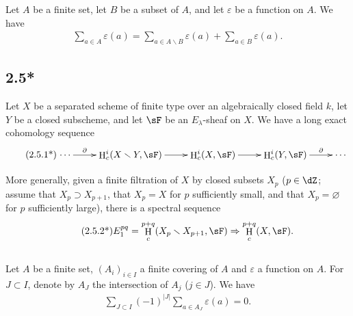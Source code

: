 \documentclass[oneside]{book}
\DeclareMathOperator{\h}{H}
\renewcommand{\setminus}{\smallsetminus}
\theoremstyle{sga-source}
\theoremstyle{sga-source-dash}
\theoremstyle{sga-source-dotdash}
\theoremstyle{sga-source-number-note-dash}
\theoremstyle{sga-source-note-number-dotdash}
\theoremstyle{sga-source-example-dotdash}
\theoremstyle{sga-source-inline-number}
\theoremstyle{sga-source-bare-number}
\theoremstyle{sga-source}
\newcommand{\PrintPage}[1]{}\newcommand{\MathPage}[1]{}\newcommand{\PrintCite}[2]{#1}\newcommand{\var}[3]{#2}
\begin{document}
Let $A$ be a finite set, let $B$ be a subset of $A$, and let $\varepsilon$ be a 
function on $A$. We have 
\begin{align*}\tag{2.5.1}\label{VI:2-5-1}
  \sum_{a\in A} \varepsilon(a) = \sum_{a\in A\setminus B}\varepsilon(a) + \sum_{a\in B} \varepsilon(a) \text{.}
\end{align*}





\subsection*{2.5*}\label{VI:2-5*}

Let $X$ be a separated scheme of finite type over an algebraically closed field $k$, 
let $Y$ be a closed subscheme, and let $\sF$ be an $E_\lambda$-sheaf on $X$. We have 
a long exact cohomology sequence 
\begin{align*}\tag{2.5.1*}\label{VI:eq:2-5-1*}
\xymatrix{
  \cdots \ar[r]^-\partial 
    & \h_c^i(X\setminus Y,\sF) \ar[r] 
    & \h_c^i(X,\sF) \ar[r] 
    & \h_c^i(Y,\sF) \ar[r]^-\partial 
    & \cdots 
}
\end{align*}

\PrintPage{186}
More generally, given a finite filtration of $X$ by closed subsets 
$X_p$ ($p\in \dZ$; assume that $X_p\supset X_{p+1}$, that $X_p=X$ 
for $p$ sufficiently small, and that $X_p=\varnothing$ for $p$ sufficiently large), there is a 
spectral sequence 
\begin{align*}\tag{2.5.2*}\label{VI:eq:2-5-2*}
  E_1^{p q} = \h_c^{p+q}(X_p\setminus X_{p+1},\sF) \Rightarrow \h_c^{p+q}(X,\sF) \text{.}
\end{align*}





\subsection{}\label{VI:2-6}

Let $A$ be a finite set, $(A_i)_{i\in I}$ a finite covering of $A$ and 
$\varepsilon$ a function on $A$. For $J\subset I$, denote by $A_J$ 
the intersection of $A_j$ ($j\in J$). We have 
\begin{align*}\tag{2.6.1}\label{VI:eq:2-6-1}
  \sum_{J\subset I} (-1)^{|J|} \sum_{a\in A_J} \varepsilon(a) = 0 \text{.}
\end{align*}
\end{document}
